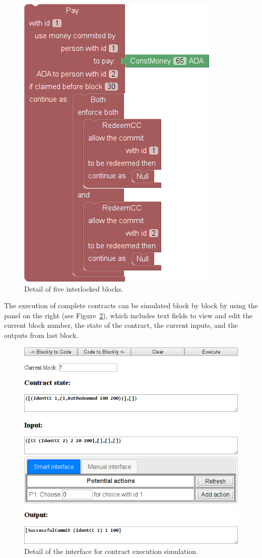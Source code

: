 \documentclass[
      acmsmall
    , screen
    , review=true
  ]{acmart}
\begin{document}
\begin{figure}
\centering{}\includegraphics[scale=0.5]{pix/detail1}\caption{\label{fig:detail-of-block}Detail of five interlocked 
blocks.}
\end{figure}

The execution of complete contracts can be simulated block by block
by using the panel on the right (see Figure~\ref{fig:detail-of-interface}),
which includes text fields to view and edit the current block number,
the state of the contract, the current inputs, and the outputs from
last block.

\begin{figure}
\centering{}\includegraphics[scale=0.5]{pix/detail2}\caption{\label{fig:detail-of-interface}Detail of the interface for 
contract
execution simulation.}
\end{figure}
\end{document}
